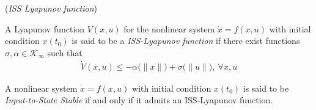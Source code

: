 \begin{bw_box}
\begin{definition}\cite{Sontag2008} (\textit{ISS Lyapunov function})

  A Lyapunov function $V(x,u)$ for the nonlinear system $\dot{x} = f(x,u)$
  with initial condition $x(t_0)$ is said to be a \textit{ISS-Lyapunov function}
  if there exist functions $\sigma, \alpha \in \mathcal{K}_{\infty}$ such that
  \begin{align}
    \dot{V}(x,u) \leq -\alpha\big(\|x\|\big) + \sigma\big(\|u\|\big),\ \forall x,u
  \end{align}
  \label{def:ISS_Lyapunov}
\end{definition}
\end{bw_box}

\begin{bw_box}
\begin{theorem}\cite{Sontag2008}

  A nonlinear system $\dot{x} = f(x,u)$ with initial condition $x(t_0)$ is said
  to be \textit{Input-to-State Stable} if and only if it admits an
  ISS-Lyapunov function.
  \label{def:ISS_Lyapunov_admit_theorem}
\end{theorem}
\end{bw_box}
